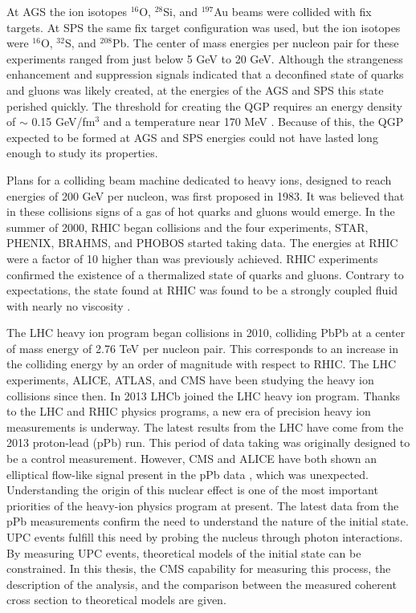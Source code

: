   At AGS the ion isotopes $^{16}$O, $^{28}$Si, and $^{197}$Au beams were 
    collided with fix targets. 
  At SPS the same fix target configuration was used, but the ion isotopes were 
    $^{16}$O, $^{32}$S, and $^{208}$Pb.
  The center of mass energies per nucleon pair for these experiments ranged
    from just below 5 GeV to 20 GeV. 
  Although the strangeness enhancement and \JPsi{} suppression 
    signals indicated that a deconfined state of quarks and gluons was likely 
    created, at the energies of the AGS and SPS this state perished quickly. 
  The threshold for creating the QGP requires an energy density of $\sim$ 0.15 
    GeV/fm$^{3}$ and a temperature near 170 MeV \cite{qgpThresh}.
  Because of this, the QGP expected to be formed at AGS and SPS energies could 
    not have lasted long enough to study its properties. 

  Plans for a colliding beam machine dedicated to heavy ions, designed to reach 
    energies of 200 GeV per nucleon, was first proposed in 1983.
  It was believed that in these collisions signs of a gas of hot quarks and 
    gluons would emerge.
  In the summer of 2000, RHIC began collisions and the four experiments,
    STAR, PHENIX, BRAHMS, and PHOBOS started taking data. 
  The energies at RHIC were a factor of 10 higher than was previously achieved. 
  RHIC experiments confirmed the existence of a  thermalized state of quarks and 
    gluons.
  Contrary to expectations, the state found at RHIC was found to be 
    a strongly coupled fluid with nearly no viscosity \cite{whi}.

  The LHC heavy ion program began collisions in 2010, colliding PbPb at 
    a center of mass energy of 2.76 TeV per nucleon pair. 
  This corresponds to an increase in the colliding energy by an order of 
    magnitude with respect to RHIC. 
  The LHC experiments, ALICE, ATLAS, and CMS have been studying the heavy ion 
    collisions since then. 
  In 2013 LHCb joined the LHC heavy ion program. 
  Thanks to the LHC and RHIC physics programs, a new era of precision
    heavy ion measurements is underway. 
  The latest results from the LHC have come from the 2013 proton-lead (pPb)
    run.
  This period of data taking was originally designed to be a control 
    measurement.
  However, CMS and ALICE have both shown an elliptical flow-like signal present
    in the pPb data \cite{}, which was unexpected.
  Understanding the origin of this nuclear effect is one of the most important
    priorities of the heavy-ion physics program at present. 
  The latest data from the pPb measurements confirm the need to 
    understand the nature of the initial state. 
  UPC events fulfill this need by probing the nucleus through photon 
    interactions.
  By measuring UPC \JPsi{} events, theoretical models of the initial state can 
    be constrained.
  In this thesis, the CMS capability for measuring this process, the 
  description of the analysis, and the comparison between the measured 
    coherent \JPsi{} cross section to theoretical models are given. 


